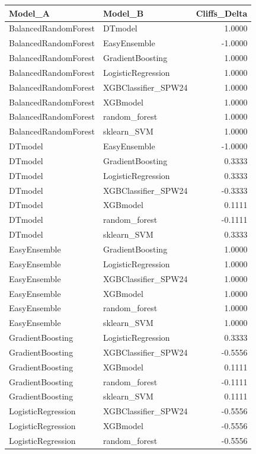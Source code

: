 \begin{table}[t]
\centering
\begin{tabular}{llr}
\toprule
Model_A & Model_B & Cliffs_Delta \\
\midrule
BalancedRandomForest & DTmodel & 1.0000 \\
BalancedRandomForest & EasyEnsemble & -1.0000 \\
BalancedRandomForest & GradientBoosting & 1.0000 \\
BalancedRandomForest & LogisticRegression & 1.0000 \\
BalancedRandomForest & XGBClassifier_SPW24 & 1.0000 \\
BalancedRandomForest & XGBmodel & 1.0000 \\
BalancedRandomForest & random_forest & 1.0000 \\
BalancedRandomForest & sklearn_SVM & 1.0000 \\
DTmodel & EasyEnsemble & -1.0000 \\
DTmodel & GradientBoosting & 0.3333 \\
DTmodel & LogisticRegression & 0.3333 \\
DTmodel & XGBClassifier_SPW24 & -0.3333 \\
DTmodel & XGBmodel & 0.1111 \\
DTmodel & random_forest & -0.1111 \\
DTmodel & sklearn_SVM & 0.3333 \\
EasyEnsemble & GradientBoosting & 1.0000 \\
EasyEnsemble & LogisticRegression & 1.0000 \\
EasyEnsemble & XGBClassifier_SPW24 & 1.0000 \\
EasyEnsemble & XGBmodel & 1.0000 \\
EasyEnsemble & random_forest & 1.0000 \\
EasyEnsemble & sklearn_SVM & 1.0000 \\
GradientBoosting & LogisticRegression & 0.3333 \\
GradientBoosting & XGBClassifier_SPW24 & -0.5556 \\
GradientBoosting & XGBmodel & 0.1111 \\
GradientBoosting & random_forest & -0.1111 \\
GradientBoosting & sklearn_SVM & 0.1111 \\
LogisticRegression & XGBClassifier_SPW24 & -0.5556 \\
LogisticRegression & XGBmodel & -0.5556 \\
LogisticRegression & random_forest & -0.5556 \\

\end{tabular}
\end{table}
